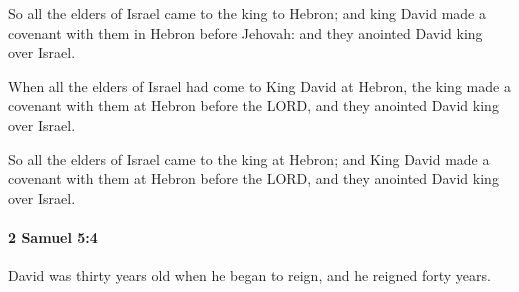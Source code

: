 			\begin{versebox}
					\item[BHS] 
					\item[ASV] So all the elders of Israel came to the king to Hebron; and king David made a covenant with them in Hebron before Jehovah: and they anointed David king over Israel.
					\item[NIV] When all the elders of Israel had come to King David at Hebron, the king made a covenant with them at Hebron before the LORD, and they anointed David king over Israel.
					\item[NRSV] So all the elders of Israel came to the king at Hebron; and King David made a covenant with them at Hebron before the LORD, and they anointed David king over Israel.
			\end{versebox}

		\paragraph{2 Samuel 5:4} %
			\label{2SAMUEL-5-4}

			David was thirty years old when he began to reign, and he reigned forty years.

